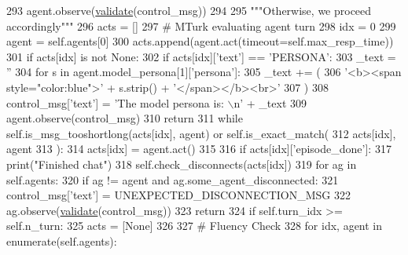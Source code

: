 \begin{DoxyCode}
293                 agent.observe(\hyperlink{namespaceparlai_1_1core_1_1worlds_afc3fad603b7bce41dbdc9cdc04a9c794}{validate}(control\_msg))
294 
295         \textcolor{stringliteral}{"""Otherwise, we proceed accordingly"""}
296         acts = []
297         \textcolor{comment}{# MTurk evaluating agent turn}
298         idx = 0
299         agent = self.agents[0]
300         acts.append(agent.act(timeout=self.max\_resp\_time))
301         \textcolor{keywordflow}{if} acts[idx] \textcolor{keywordflow}{is} \textcolor{keywordflow}{not} \textcolor{keywordtype}{None}:
302             \textcolor{keywordflow}{if} acts[idx][\textcolor{stringliteral}{'text'}] == \textcolor{stringliteral}{'PERSONA'}:
303                 \_text = \textcolor{stringliteral}{''}
304                 \textcolor{keywordflow}{for} s \textcolor{keywordflow}{in} agent.model\_persona[1][\textcolor{stringliteral}{'persona'}]:
305                     \_text += (
306                         \textcolor{stringliteral}{'<b><span style="color:blue">'} + s.strip() + \textcolor{stringliteral}{'</span></b><br>'}
307                     )
308                 control\_msg[\textcolor{stringliteral}{'text'}] = \textcolor{stringliteral}{'The model persona is: \(\backslash\)n'} + \_text
309                 agent.observe(control\_msg)
310                 \textcolor{keywordflow}{return}
311             \textcolor{keywordflow}{while} self.is\_msg\_tooshortlong(acts[idx], agent) \textcolor{keywordflow}{or} self.is\_exact\_match(
312                 acts[idx], agent
313             ):
314                 acts[idx] = agent.act()
315 
316             \textcolor{keywordflow}{if} acts[idx][\textcolor{stringliteral}{'episode\_done'}]:
317                 print(\textcolor{stringliteral}{"Finished chat"})
318                 self.check\_disconnects(acts[idx])
319                 \textcolor{keywordflow}{for} ag \textcolor{keywordflow}{in} self.agents:
320                     \textcolor{keywordflow}{if} ag != agent \textcolor{keywordflow}{and} ag.some\_agent\_disconnected:
321                         control\_msg[\textcolor{stringliteral}{'text'}] = UNEXPECTED\_DISCONNECTION\_MSG
322                         ag.observe(\hyperlink{namespaceparlai_1_1core_1_1worlds_afc3fad603b7bce41dbdc9cdc04a9c794}{validate}(control\_msg))
323                         \textcolor{keywordflow}{return}
324                 \textcolor{keywordflow}{if} self.turn\_idx >= self.n\_turn:
325                     acts = [\textcolor{keywordtype}{None}]
326 
327                     \textcolor{comment}{# Fluency Check}
328                     \textcolor{keywordflow}{for} idx, agent \textcolor{keywordflow}{in} enumerate(self.agents):

\end{DoxyCode}
